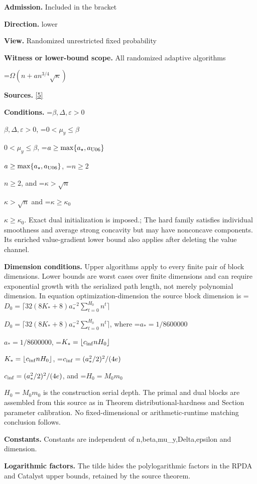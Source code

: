 \documentclass[10pt,a4paper]{article}
\newcommand{\AtlasMath}[1]{\par\begingroup\centering\setbox0=\hbox{$\displaystyle #1$}\ifdim\wd0>1.4\linewidth\typeout{ATLAS WIDE FORMULA: \the\wd0}\fi\ifdim\wd0>\linewidth\resizebox{\linewidth}{!}{\box0}\else\box0\fi\par\endgroup}
\newcommand{\AtlasInlineMath}[1]{\begingroup\setbox0=\hbox{$#1$}\ifdim\wd0>.4\linewidth\endgroup\AtlasMath{#1}\else\endgroup$#1$\fi}
\begin{document}
\textbf{Admission.} Included in the bracket



\textbf{Direction.} lower



\textbf{View.} Randomized unrestricted fixed probability



\textbf{Witness or lower-bound scope.} All randomized adaptive algorithms



\AtlasMath{\Omega(n+a n^{3/4}\sqrt\kappa)}


\textbf{Sources.} \href{https://github.com/WU-Wendao/Colombo/blob/main/colombo_sensorium/Complexity_altas/data/sources/colombo/U06/manuscript.pdf}{[5]}



\textbf{Conditions.} \AtlasInlineMath{\beta,\Delta,\varepsilon>0}, \AtlasInlineMath{0<\mu_y\le\beta}, \AtlasInlineMath{a\ge\max\{a_\star,a_{\rm U06}\}}, \AtlasInlineMath{n\ge2}, and \AtlasInlineMath{\kappa>\sqrt n} and \AtlasInlineMath{\kappa\ge\kappa_0}. Exact dual initialization is imposed.; The hard family satisfies individual smoothness and average strong concavity but may have nonconcave components. Its enriched value-gradient lower bound also applies after deleting the value channel.



\textbf{Dimension conditions.} Upper algorithms apply to every finite pair of block dimensions. Lower bounds are worst cases over finite dimensions and can require exponential growth with the serialized path length, not merely polynomial dimension. In equation optimization-dimension the source block dimension is \AtlasInlineMath{D_0=\lceil32(8K_*+8)a_*^{-2}\sum_{t=0}^{H_0}n^t\rceil}, where \AtlasInlineMath{a_*=1/8600000}, \AtlasInlineMath{K_*=\lfloor c_{\rm inf}nH_0\rfloor}, \AtlasInlineMath{c_{\rm inf}=(a_*^2/2)^2/(4e)}, and \AtlasInlineMath{H_0=M_0m_0} is the construction serial depth. The primal and dual blocks are assembled from this source as in Theorem distributional-hardness and Section parameter calibration. No fixed-dimensional or arithmetic-runtime matching conclusion follows.



\textbf{Constants.} Constants are independent of n,beta,mu\_y,Delta,epsilon and dimension.



\textbf{Logarithmic factors.} The tilde hides the polylogarithmic factors in the RPDA and Catalyst upper bounds, retained by the source theorem.
\end{document}
